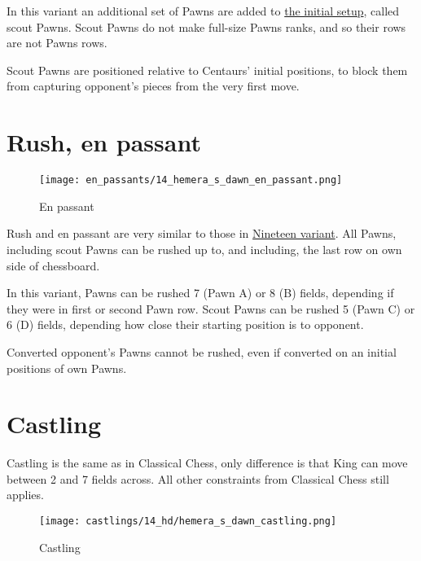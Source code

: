 In this variant an additional set of Pawns are added to \hyperref[fig:14_hemera_s_dawn]{the initial setup},
called scout Pawns. Scout Pawns do not make full-size Pawns ranks, and so their rows are not Pawns rows.

Scout Pawns are positioned relative to Centaurs' initial positions, to block them from capturing opponent's
pieces from the very first move.

\clearpage %

\section*{Rush, en passant}

\vspace*{-1.2\baselineskip}
\noindent
\begin{figure}[!h]
\texttt{[image: en\_passants/14\_hemera\_s\_dawn\_en\_passant.png]}
\caption{En passant}
\label{fig:14_hemera_s_dawn_en_passant}
\end{figure}

Rush and en passant are very similar to those in \hyperref[fig:12_nineteen_en_passant]{Nineteen variant}.
All Pawns, including scout Pawns can be rushed up to, and including, the last row on own side of
chessboard.

In this variant, Pawns can be rushed 7 (Pawn A) or 8 (B) fields, depending if they were in first or second
Pawn row. Scout Pawns can be rushed 5 (Pawn C) or 6 (D) fields, depending how close their starting position
is to opponent.

Converted opponent's Pawns cannot be rushed, even if converted on an initial positions
of own Pawns.

\clearpage %

\section*{Castling}

Castling is the same as in Classical Chess, only difference is that King can move between 2 and 7 fields across.
All other constraints from Classical Chess still applies.

\noindent
\begin{figure}[!h]
\texttt{[image: castlings/14\_hd/hemera\_s\_dawn\_castling.png]}
\caption{Castling}
\label{fig:hemera_s_dawn_castling}
\end{figure}

